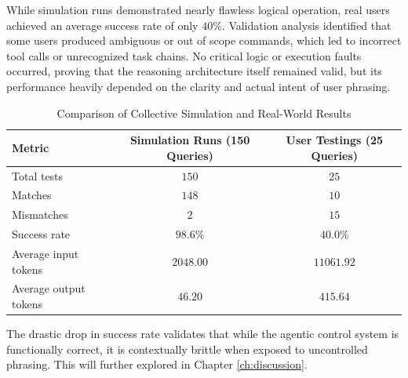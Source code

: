 While simulation runs demonstrated nearly flawless logical operation, real users achieved an average success rate of only $40\%$.  
Validation analysis identified that some users produced ambiguous or out of scope commands, which led to incorrect tool calls or unrecognized task chains. No critical logic or execution faults occurred, proving that the reasoning architecture itself remained valid, but its performance heavily depended on the clarity and actual intent of user phrasing.

\begin{table}[H]
\centering
\caption{Comparison of Collective Simulation and Real-World Results}
\label{tab:comparisonresults}
\begin{tabular}{l c c}
\hline
\textbf{Metric} & \textbf{Simulation Runs (150 Queries)} & \textbf{User Testings (25 Queries)} \\ \hline
Total tests & $150$ & $25$ \\
Matches & $148$ & $10$ \\
Mismatches & $2$ & $15$ \\
Success rate & $98.6\%$ & $40.0\%$ \\
Average input tokens & $2048.00$ & $11061.92$ \\
Average output tokens & $46.20$ & $415.64$ \\ \hline
\end{tabular}
\end{table}

The drastic drop in success rate validates that while the agentic control system is functionally correct, it is contextually brittle when exposed to uncontrolled phrasing. This will further explored in Chapter \ref{ch:discussion}.
